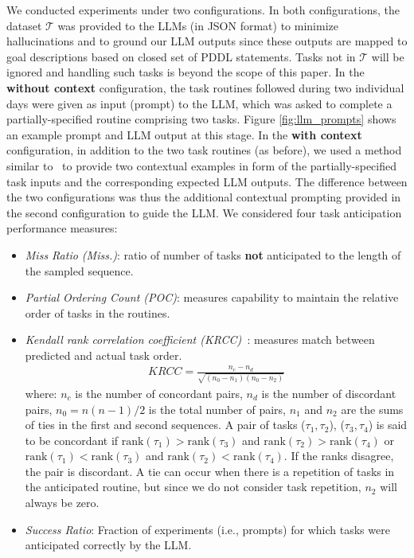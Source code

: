 We conducted experiments under two configurations. In both configurations, the dataset $\mathcal{T}$ was provided to the LLMs (in JSON format) to minimize hallucinations and to ground our LLM outputs since these outputs are mapped to goal descriptions based on closed set of PDDL statements. Tasks not in $\mathcal{T}$ will be ignored and handling such tasks is beyond the scope of this paper. In the \textbf{without context} configuration, the task routines followed during two individual days were given as input (prompt) to the LLM, which was asked to complete a partially-specified routine comprising two tasks. Figure \ref{fig:llm_prompts} shows an example prompt and LLM output at this stage. In the \textbf{with context} configuration, in addition to the two task routines (as before), we used a method similar to~\cite{silver2023generalized} to provide two contextual examples in form of the partially-specified task inputs and the corresponding expected LLM outputs. The difference between the two configurations was thus the additional contextual prompting provided in the second configuration to guide the LLM. We considered four task anticipation performance measures:
\vspace{-0.5em}
\begin{itemize}
\itemsep-10pt
    \item \textit{Miss Ratio (Miss.)}: ratio of number of tasks \textbf{not} anticipated to the length of the sampled sequence.

\item \textit{Partial Ordering Count (POC)}: measures capability to maintain the relative order of tasks in the routines.

\item \textit{Kendall rank correlation coefficient (KRCC)~\cite{Kendall}}: measures match between predicted and actual task order.
\vspace{-0.5em}
\begin{align*}
    KRCC = \frac{n_c - n_d}{\sqrt{(n_0 - n_1)(n_0 - n_2)}}
\end{align*}
where: \(n_c\) is the number of concordant pairs, \(n_d\) is the number of discordant pairs, \(n_0 = n(n-1)/2\) is the total number of pairs, \(n_1\) and \(n_2\) are the sums of ties in the first and second sequences. A pair of tasks (\(\tau_{1}, \tau_{2}\)), (\(\tau_{3}, \tau_{4}\)) is said to be concordant if \(\text{rank}(\tau_1) > \text{rank}(\tau_3)\) and \(\text{rank}(\tau_2) > \text{rank}(\tau_{4})\) or \(\text{rank}(\tau_1) < \text{rank}(\tau_3)\) and \(\text{rank}(\tau_2) < \text{rank}(\tau_{4})\). If the ranks disagree, the pair is discordant. A tie can occur when there is a repetition of tasks in the anticipated routine, but since we do not consider task repetition, $n_2$ will always be zero.
    \item \textit{Success Ratio}: Fraction of experiments (i.e., prompts) for which tasks were anticipated correctly by the LLM.
\end{itemize}
